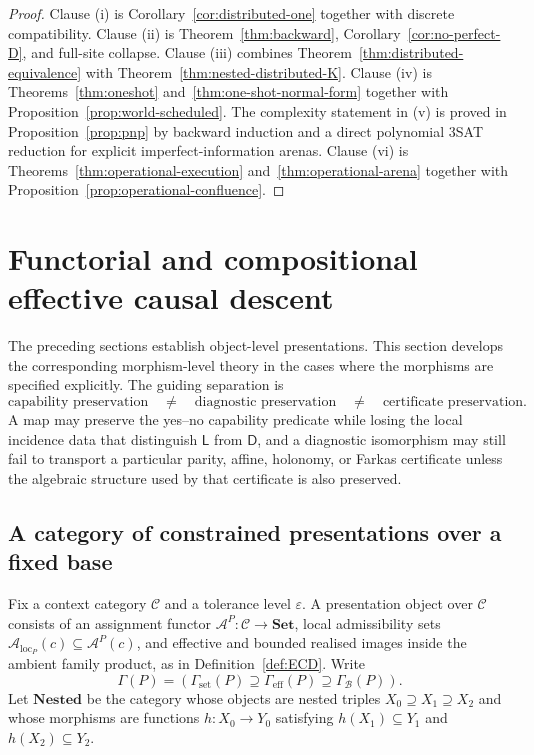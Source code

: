 \documentclass[11pt]{article}
\theoremstyle{plain}
\theoremstyle{definition}
\theoremstyle{remark}
\newcommand{\LocalAdm}{\mathcal{A}_{\mathrm{loc}}}
\newcommand{\eps}{\varepsilon}
\begin{document}
\begin{proof}
Clause (i) is Corollary~\ref{cor:distributed-one} together with discrete
compatibility. Clause (ii) is Theorem~\ref{thm:backward},
Corollary~\ref{cor:no-perfect-D}, and full-site collapse. Clause (iii) combines
Theorem~\ref{thm:distributed-equivalence} with
Theorem~\ref{thm:nested-distributed-K}. Clause (iv) is
Theorems~\ref{thm:oneshot} and~\ref{thm:one-shot-normal-form} together with
Proposition~\ref{prop:world-scheduled}. The complexity statement in (v) is
proved in Proposition~\ref{prop:pnp} by backward induction and a direct
polynomial 3SAT reduction for explicit imperfect-information arenas. Clause (vi) is
Theorems~\ref{thm:operational-execution} and~\ref{thm:operational-arena} together
with Proposition~\ref{prop:operational-confluence}.
\end{proof}


\section{Functorial and compositional effective causal descent}
\label{sec:functorial-programme}

The preceding sections establish object-level presentations. This section develops
the corresponding morphism-level theory in the cases where the morphisms are
specified explicitly. The guiding separation is
\[
\text{capability preservation}
\quad\neq\quad
\text{diagnostic preservation}
\quad\neq\quad
\text{certificate preservation}.
\]
A map may preserve the yes--no capability predicate while losing the local
incidence data that distinguish $\mathsf L$ from $\mathsf D$, and a diagnostic
isomorphism may still fail to transport a particular parity, affine, holonomy, or
Farkas certificate unless the algebraic structure used by that certificate is
also preserved.

\subsection{A category of constrained presentations over a fixed base}

Fix a context category $\mathcal C$ and a tolerance level $\eps$. A presentation
object over $\mathcal C$ consists of an assignment functor
$\mathcal A^P:\mathcal C\to\mathbf{Set}$, local admissibility sets
$\LocalAdm_P(c)\subseteq\mathcal A^P(c)$, and effective and bounded realised
images inside the ambient family product, as in Definition~\ref{def:ECD}. Write
\[
\Gamma(P)=
\left(
\Gamma_{\mathrm{set}}(P)
\supseteq
\Gamma_{\mathrm{eff}}(P)
\supseteq
\Gamma_{\mathcal B}(P)
\right).
\]
Let $\mathbf{Nested}$ be the category whose objects are nested triples
$X_0\supseteq X_1\supseteq X_2$ and whose morphisms are functions
$h:X_0\to Y_0$ satisfying $h(X_1)\subseteq Y_1$ and
$h(X_2)\subseteq Y_2$.
\end{document}
